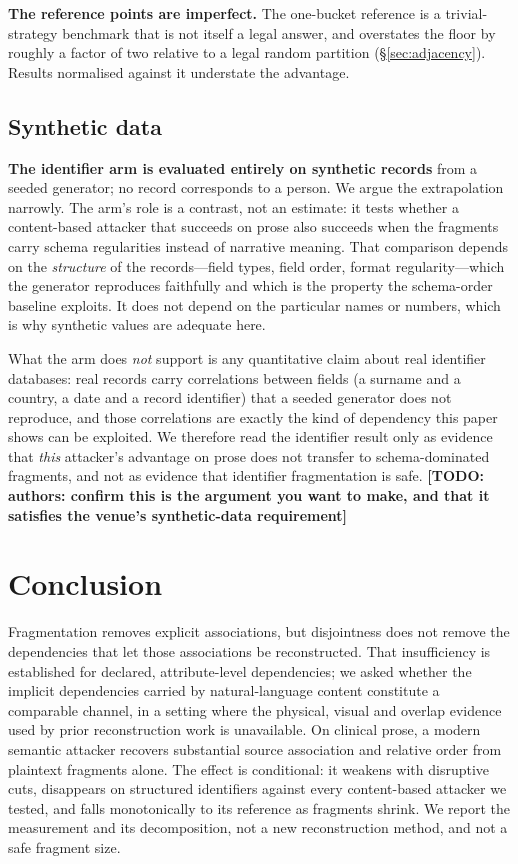 \documentclass[sigconf,nonacm]{acmart}
\newcommand{\TODO}[1]{\textbf{[TODO: #1]}}
\begin{document}
\textbf{The reference points are imperfect.} The one-bucket reference is a
trivial-strategy benchmark that is not itself a legal answer, and overstates the
floor by roughly a factor of two relative to a legal random partition
(\S\ref{sec:adjacency}). Results normalised against it understate the advantage.

\subsection{Synthetic data}
\label{sec:synthetic}
\textbf{The identifier arm is evaluated entirely on synthetic records} from a
seeded generator; no record corresponds to a person. We argue the extrapolation
narrowly. The arm's role is a contrast, not an estimate: it tests whether a
content-based attacker that succeeds on prose also succeeds when the fragments
carry schema regularities instead of narrative meaning. That comparison depends
on the \emph{structure} of the records---field types, field order, format
regularity---which the generator reproduces faithfully and which is the property
the schema-order baseline exploits. It does not depend on the particular names or
numbers, which is why synthetic values are adequate here.

What the arm does \emph{not} support is any quantitative claim about real
identifier databases: real records carry correlations between fields (a surname
and a country, a date and a record identifier) that a seeded generator does not
reproduce, and those correlations are exactly the kind of dependency this paper
shows can be exploited. We therefore read the identifier result only as evidence
that \emph{this} attacker's advantage on prose does not transfer to
schema-dominated fragments, and not as evidence that identifier fragmentation is
safe. \TODO{authors: confirm this is the argument you want to make, and that it
satisfies the venue's synthetic-data requirement}

\section{Conclusion}
Fragmentation removes explicit associations, but disjointness does not remove the
dependencies that let those associations be reconstructed. That insufficiency is
established for declared, attribute-level dependencies; we asked whether the
implicit dependencies carried by natural-language content constitute a comparable
channel, in a setting where the physical, visual and overlap evidence used by
prior reconstruction work is unavailable. On clinical prose, a modern semantic
attacker recovers substantial source association and relative order from
plaintext fragments alone. The effect is conditional: it weakens with disruptive
cuts, disappears on structured identifiers against every content-based attacker
we tested, and falls monotonically to its reference as fragments shrink. We
report the measurement and its decomposition, not a new reconstruction method,
and not a safe fragment size.
\end{document}
